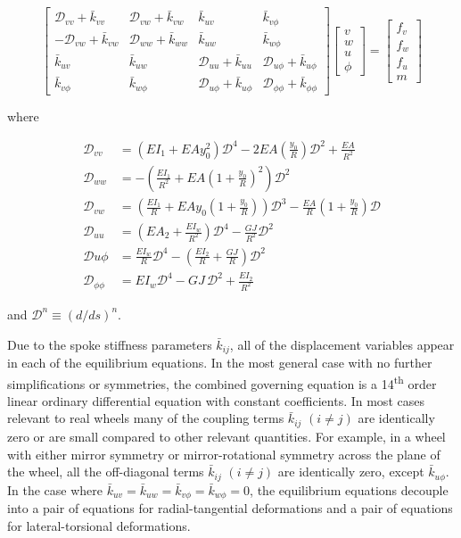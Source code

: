 \documentclass[../thesis.tex]{subfiles}
\newcommand{\D}{\mathcal{D}}
\begin{document}
\begin{equation}
\label{eq:EulerLagrange}
\begin{bmatrix}
 \D_{vv} + \bar{k}_{vv} & \D_{vw} + \bar{k}_{vw} & \bar{k}_{uv} & \bar{k}_{v\phi}\\
-\D_{vw} + \bar{k}_{vw} & \D_{ww} + \bar{k}_{ww} & \bar{k}_{uw} & \bar{k}_{w\phi}\\
\bar{k}_{uv}    & \bar{k}_{uw}    & \D_{uu} + \bar{k}_{uu} & \D_{u\phi} + \bar{k}_{u\phi}\\
\bar{k}_{v\phi} & \bar{k}_{w\phi} & \D_{u\phi} + \bar{k}_{u\phi} & \D_{\phi\phi} + \bar{k}_{\phi\phi}
\end{bmatrix}
\begin{bmatrix}
v\\w\\u\\\phi
\end{bmatrix}=
\begin{bmatrix}
f_v\\f_w\\f_u\\m
\end{bmatrix}
\end{equation}

where

\begin{align*}
\D_{vv} &= (EI_1 + EAy_0^2)\D^4 - 2EA\left(\frac{y_0}{R}\right)\D^2 + \frac{EA}{R^2}\\
\D_{ww} &= -\left(\frac{EI_1}{R^2} + EA\left(1+\frac{y_0}{R}\right)^2\right)\D^2\\
\D_{vw} &= \left(\frac{EI_1}{R} + EAy_0\left(1+\frac{y_0}{R}\right)\right)\D^3 - \frac{EA}{R}\left(1+\frac{y_0}{R}\right)\D\\
\D_{uu} &= \left(EA_2 + \frac{EI_w}{R^2}\right)\D^4 - \frac{GJ}{R^2}\D^2\\
\D {u\phi} &= \frac{EI_w}{R}\D^4 - \left(\frac{EI_2}{R} + \frac{GJ}{R}\right)\D^2\\
\D_{\phi\phi} &= EI_w\D^4 - GJ\,\D^2 + \frac{EI_2}{R^2}
\end{align*}

and $\D^n \equiv (d/ds)^n$.

Due to the spoke stiffness parameters $\bar{k}_{ij}$, all of the displacement variables appear in each of the equilibrium equations. In the most general case with no further simplifications or symmetries, the combined governing equation is a 14\textsuperscript{th} order linear ordinary differential equation with constant coefficients. In most cases relevant to real wheels many of the coupling terms $\bar{k}_{ij}$ $(i \neq j)$ are identically zero or are small compared to other relevant quantities. For example, in a wheel with either mirror symmetry or mirror-rotational symmetry across the plane of the wheel, all the off-diagonal terms $\bar{k}_{ij}$ $(i \neq j)$ are identically zero, except $\bar{k}_{u\phi}$. In the case where $\bar{k}_{uv}=\bar{k}_{uw}=\bar{k}_{v\phi}=\bar{k}_{w\phi}=0$, the equilibrium equations decouple into a pair of equations for radial-tangential deformations and a pair of equations for lateral-torsional deformations.
\end{document}
